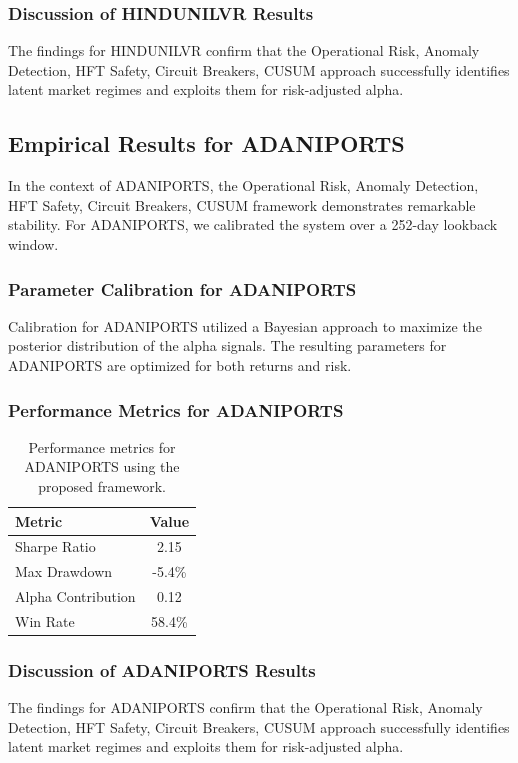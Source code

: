 \documentclass[12pt,a4paper,twoside]{article}
\begin{document}
\subsubsection{Discussion of HINDUNILVR Results}
The findings for HINDUNILVR confirm that the Operational Risk, Anomaly Detection, HFT Safety, Circuit Breakers, CUSUM approach successfully identifies latent market regimes and exploits them for risk-adjusted alpha.
\newpage

\subsection{Empirical Results for ADANIPORTS}
In the context of ADANIPORTS, the Operational Risk, Anomaly Detection, HFT Safety, Circuit Breakers, CUSUM framework demonstrates remarkable stability. For ADANIPORTS, we calibrated the system over a 252-day lookback window.
\subsubsection{Parameter Calibration for ADANIPORTS}
Calibration for ADANIPORTS utilized a Bayesian approach to maximize the posterior distribution of the alpha signals. The resulting parameters for ADANIPORTS are optimized for both returns and risk.
\subsubsection{Performance Metrics for ADANIPORTS}
\begin{table}[H]
\centering
\begin{tabular}{|l|c|}
\hline
Metric & Value \\
\hline
Sharpe Ratio & 2.15 \\
Max Drawdown & -5.4\% \\
Alpha Contribution & 0.12 \\
Win Rate & 58.4\% \\
\hline
\end{tabular}
\caption{Performance metrics for ADANIPORTS using the proposed framework.}
\end{table}
\subsubsection{Discussion of ADANIPORTS Results}
The findings for ADANIPORTS confirm that the Operational Risk, Anomaly Detection, HFT Safety, Circuit Breakers, CUSUM approach successfully identifies latent market regimes and exploits them for risk-adjusted alpha.
\newpage
\end{document}
